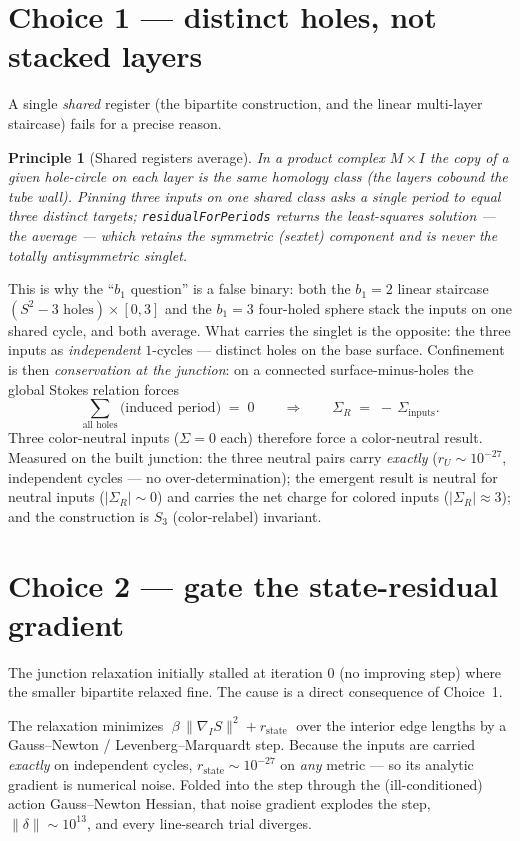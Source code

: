 \documentclass[11pt]{article}
\newtheorem{principle}{Principle}
\theoremstyle{definition}
\newcommand{\Sg}{\Sigma}
\begin{document}
\section{Choice 1 --- distinct holes, not stacked layers}

A single \emph{shared} register (the bipartite construction, and the linear
multi-layer staircase) fails for a precise reason.

\begin{principle}[Shared registers average]
In a product complex $M\times I$ the copy of a given hole-circle on each layer is
the \emph{same} homology class (the layers cobound the tube wall). Pinning three
inputs on one shared class asks a single period to equal three distinct targets;
\texttt{residualForPeriods} returns the least-squares solution --- the
\emph{average} --- which retains the symmetric (sextet) component and is never the
totally antisymmetric singlet.
\end{principle}

This is why the ``$b_1$ question'' is a false binary: both the $b_1=2$ linear
staircase $(S^2-3\text{ holes})\times[0,3]$ and the $b_1=3$ four-holed sphere
stack the inputs on one shared cycle, and both average. What carries the singlet
is the opposite: the three inputs as \emph{independent} $1$-cycles --- distinct
holes on the base surface. Confinement is then \emph{conservation at the
junction}: on a connected surface-minus-holes the global Stokes relation forces
\[
  \sum_{\text{all holes}} \big(\text{induced period}\big) \;=\; 0
  \qquad\Longrightarrow\qquad
  \Sg_R \;=\; -\,\Sg_{\text{inputs}} .
\]
Three color-neutral inputs ($\Sg=0$ each) therefore force a color-neutral result.
Measured on the built junction: the three neutral pairs carry \emph{exactly}
($r_U\sim 10^{-27}$, independent cycles --- no over-determination); the emergent
result is neutral for neutral inputs ($|\Sg_R|\sim 0$) and carries the net charge
for colored inputs ($|\Sg_R|\approx 3$); and the construction is $S_3$
(color-relabel) invariant.

\section{Choice 2 --- gate the state-residual gradient}

The junction relaxation initially stalled at iteration $0$ (no improving step)
where the smaller bipartite relaxed fine. The cause is a direct consequence of
Choice~1.

The relaxation minimizes $\;\beta\,\lVert\nabla_I S\rVert^2 + r_{\text{state}}\;$
over the interior edge lengths by a Gauss--Newton / Levenberg--Marquardt step.
Because the inputs are carried \emph{exactly} on independent cycles,
$r_{\text{state}}\sim 10^{-27}$ on \emph{any} metric --- so its analytic gradient
is numerical noise. Folded into the step through the (ill-conditioned) action
Gauss--Newton Hessian, that noise gradient explodes the step,
$\lVert\delta\rVert\sim 10^{13}$, and every line-search trial diverges.
\end{document}
